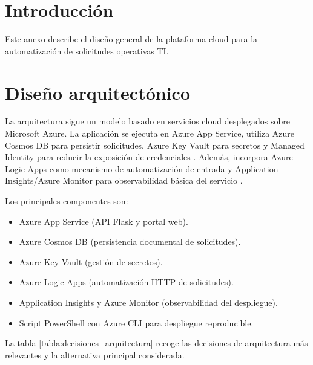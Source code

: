 
\section{Introducción}

Este anexo describe el diseño general de la plataforma cloud para la automatización de solicitudes operativas TI.

\section{Diseño arquitectónico}

La arquitectura sigue un modelo basado en servicios cloud desplegados sobre Microsoft Azure. La aplicación se ejecuta en Azure App Service, utiliza Azure Cosmos DB para persistir solicitudes, Azure Key Vault para secretos y Managed Identity para reducir la exposición de credenciales \cite{azure_appservice_python,azure_cosmos_python,azure_appservice_managed_identity,azure_appservice_keyvault_python}. Además, incorpora Azure Logic Apps como mecanismo de automatización de entrada y Application Insights/Azure Monitor para observabilidad básica del servicio \cite{azure_logic_apps,azure_monitor}.

Los principales componentes son:

\begin{itemize}
    \item Azure App Service (API Flask y portal web).
    \item Azure Cosmos DB (persistencia documental de solicitudes).
    \item Azure Key Vault (gestión de secretos).
    \item Azure Logic Apps (automatización HTTP de solicitudes).
    \item Application Insights y Azure Monitor (observabilidad del despliegue).
    \item Script PowerShell con Azure CLI para despliegue reproducible.
\end{itemize}

La tabla \ref{tabla:decisiones_arquitectura} recoge las decisiones de arquitectura más relevantes y la alternativa principal considerada.


